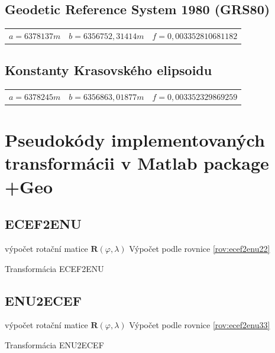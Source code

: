 \documentclass[11pt,a4paper]{article}
\begin{document}
\begin{appendices}
\subsection{Geodetic Reference System 1980 (GRS80)}
\begin{table}[ht!]
\begin{tabular}{c c c}
$a = 6 378 137 m$ & $b = 6 356 752,31414 m$ & $f = 0,00335 28106 81182$ \\
\end{tabular}
\end{table}

\subsection{Konstanty Krasovského elipsoidu}
\begin{table}[ht!]
\begin{tabular}{c c c}
$a = 6 378 245 m$ & $b = 6 356 863,01877 m$ & $f = 0,00335 23298 69259$ \\
\end{tabular}
\end{table}


\section{Pseudokódy implementovaných transformácii v Matlab package +Geo}

\subsection{ECEF2ENU} \label{appEcef2Enu}

\begin{algorithm}[H]
 výpočet rotační matice $\mathbf{R}\left(\varphi, \lambda\right)$\;	
 Výpočet podle rovnice \ref{rov:ecef2enu22}
 \caption{Transformácia ECEF2ENU}
\end{algorithm} 

\subsection{ENU2ECEF} \label{appEnu2Ecef}

\begin{algorithm}[H]
 výpočet rotační matice $\mathbf{R}\left(\varphi, \lambda\right)$\;	
 Výpočet podle rovnice \ref{rov:ecef2enu33}
 \caption{Transformácia ENU2ECEF}
\end{algorithm} 


\end{appendices}
\end{document}
